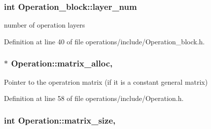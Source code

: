 \subsubsection[{\texorpdfstring{layer\+\_\+num}{layer_num}}]{\setlength{\rightskip}{0pt plus 5cm}int Operation\+\_\+block\+::layer\+\_\+num\hspace{0.3cm}{\ttfamily [protected]}}\hypertarget{class_operation__block_a907101b9a80e6ebeaa96cc7b973cf413}{}\label{class_operation__block_a907101b9a80e6ebeaa96cc7b973cf413}


number of operation layers 



Definition at line 40 of file operations/include/\+Operation\+\_\+block.\+h.

\subsubsection[{\texorpdfstring{matrix\+\_\+alloc}{matrix_alloc}}]{ $\ast$ Operation\+::matrix\+\_\+alloc\hspace{0.3cm}{\ttfamily [protected]}, {\ttfamily [inherited]}}\hypertarget{class_operation_ade4d28d271ca13950d04363aac1c382e}{}\label{class_operation_ade4d28d271ca13950d04363aac1c382e}


Pointer to the operatrion matrix (if it is a constant general matrix) 



Definition at line 58 of file operations/include/\+Operation.\+h.

\subsubsection[{\texorpdfstring{matrix\+\_\+size}{matrix_size}}]{\setlength{\rightskip}{0pt plus 5cm}int Operation\+::matrix\+\_\+size\hspace{0.3cm}{\ttfamily [protected]}, {\ttfamily [inherited]}}\hypertarget{class_operation_a8236c07112cb165a00d3869363808624}{}\label{class_operation_a8236c07112cb165a00d3869363808624}


